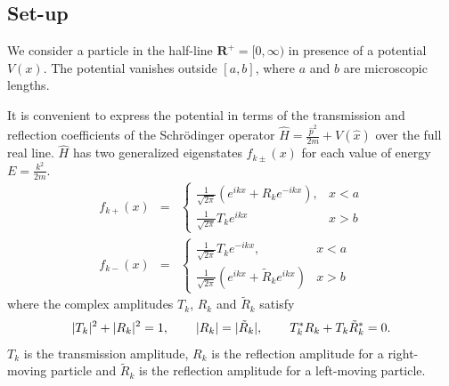 \documentclass[12pt]{article}
\numberwithin{equation}{section}
\begin{document}
 \subsection{Set-up}

 We consider a particle in the half-line ${\pmb R}^+ = [0, \infty)$ in presence of  a potential $V(x)$. The potential vanishes outside $ [a, b]$, where $a$ and $b$ are microscopic lengths.

It is convenient to express the potential in terms of the transmission and reflection coefficients  of the  Schr\"odinger operator  $\hat{H} = \frac{\hat{p}^2}{2m}+ V(\hat{x})$ over the full real line.  $\hat{H}$    has two generalized eigenstates $f_{k\pm}(x)$ for each value of energy $E = \frac{k^2}{2m}$.
\begin{eqnarray}
f_{k+}(x) &=& \left\{ \begin{array}{cc} \frac{1}{\sqrt{2\pi}} (e^{ikx} + R_k e^{-ikx}), & x < a\\
 \frac{1}{\sqrt{2\pi}} T_k e^{ikx}& x > b
 \end{array}\right. \nonumber \\
 f_{k-}(x) &=& \left\{ \begin{array}{cc} \frac{1}{\sqrt{2\pi}}  T_k e^{-ikx}, & x < a\\
\frac{1}{\sqrt{2\pi}} (e^{ikx} + \tilde{R}_k e^{ikx})& x > b
 \end{array}\right. \label{f+-}
\end{eqnarray}
where   the complex amplitudes $T_k$, $R_k$ and $\tilde{R}_k$ satisfy
\begin{eqnarray}
|T_k|^2+|R_k|^2 = 1, \hspace{0.75cm}  |R_k| = |\tilde{R}_k|,
  \hspace{0.75cm}  T^*_k R_k +T_k \tilde{R}_k^* = 0. \label{idtyscat}
\end{eqnarray}
$T_k$ is the transmission amplitude, $R_k$ is the reflection amplitude for a right-moving particle and $\tilde{R}_k$ is the reflection amplitude for a left-moving particle.
\end{document}

